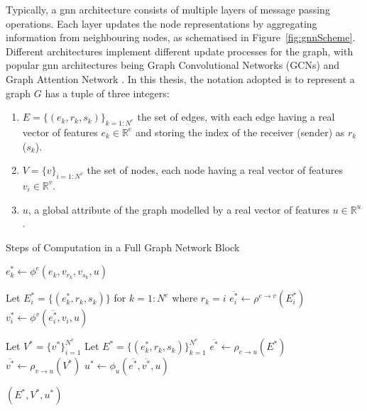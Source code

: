 Typically, a \gls{gnn} architecture consists of multiple layers of message passing operations. Each layer updates the node representations by aggregating information from neighbouring nodes, as schematised in Figure~\ref{fig:gnnScheme}. Different architectures implement different update processes for the graph, with popular \gls{gnn} architectures being Graph Convolutional Networks (GCNs) \cite{gcnPaper} and Graph Attention Network \cite{velickovic2018graph}. In this thesis, the notation adopted is to represent a graph $G$ has a tuple of three integers:
\begin{enumerate}
    \item $E = \{(e_k, r_k, s_k)\}_{k=1:N^e}$ the set of edges, with each edge having a real vector of features $e_k \in \mathbb{R}^e$ and storing the index of the receiver (sender) as $r_k$ ($s_k$).
    \item $V = \{v\}_{i=1:N^v}$ the set of nodes, each node having a real vector of features $v_i \in \mathbb{R}^v$.
    \item $u$, a global attribute of the graph modelled by a real vector of features $u \in \mathbb{R}^u$. 
\end{enumerate}

\begin{algorithm}
    \caption{Steps of Computation in a Full Graph Network Block \cite{graphInductiveBias}}
    \label{algo:graph_network}
    \begin{algorithmic}[1]
            \State $e^*_k \gets \phi^e(e_k, v_{r_k}, v_{s_k}, u)$
        \EndFor

            \State Let $E_i^* = \{(e^*_k, r_k, s_k)\}$ for $k = 1 : N^e$ where $r_k = i$
            \State $\overline{e^*_i} \gets \rho^{e \to v}(E^*_i)$
            \State $v^*_i \gets \phi^v(\overline{e^*_i}, v_i, u)$
        \EndFor

        \State Let $V^* = \{v^*\}_{i=1}^{N^v}$
        \State Let $E^* = \{(e^*_k, r_k, s_k)\}_{k=1}^{N^e}$
        \State $\overline{e^*} \gets \rho_{e \to u}(E^*)$
        \State $\overline{v^*} \gets \rho_{v \to u}(V^*)$
        \State $u^* \gets \phi_u(\overline{e^*}, \overline{v^*}, u)$

        \State \Return $(E^*, V^*, u^*)$
    \EndFunction
    \end{algorithmic}
\end{algorithm}

